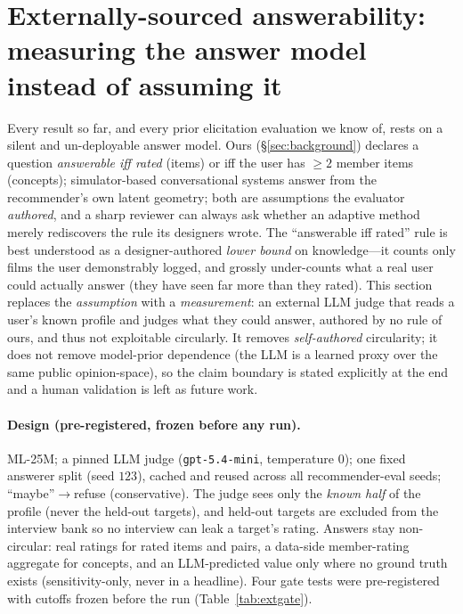 \documentclass[11pt]{article}
\begin{document}
\section{Externally-sourced answerability: measuring the answer model instead of assuming it}\label{sec:external}
Every result so far, and every prior elicitation evaluation we know of, rests on a silent and un-deployable
answer model. Ours (\S\ref{sec:background}) declares a question \emph{answerable iff rated} (items) or iff the
user has $\ge2$ member items (concepts); simulator-based conversational systems answer from the recommender's
own latent geometry; both are assumptions the evaluator \emph{authored}, and a sharp reviewer can always ask
whether an adaptive method merely rediscovers the rule its designers wrote. The ``answerable iff rated'' rule
is best understood as a designer-authored \emph{lower bound} on knowledge---it counts only films the user
demonstrably logged, and grossly under-counts what a real user could actually answer (they have seen far more
than they rated). This section replaces the \emph{assumption} with a \emph{measurement}: an external LLM judge
that reads a user's known profile and judges what they could answer, authored by no rule of ours, and thus not
exploitable circularly. It removes \emph{self-authored} circularity; it does not remove model-prior dependence
(the LLM is a learned proxy over the same public opinion-space), so the claim boundary is stated explicitly at
the end and a human validation is left as future work.

\paragraph{Design (pre-registered, frozen before any run).} ML-25M; a pinned LLM judge (\texttt{gpt-5.4-mini},
temperature $0$); one fixed answerer split (seed $123$), cached and reused across all recommender-eval seeds;
``maybe''$\to$refuse (conservative). The judge sees only the \emph{known half} of the profile (never the
held-out targets), and held-out targets are excluded from the interview bank so no interview can leak a target's
rating. Answers stay non-circular: real ratings for rated items and pairs, a data-side member-rating aggregate
for concepts, and an LLM-predicted value only where no ground truth exists (sensitivity-only, never in a headline).
Four gate tests were pre-registered with cutoffs frozen before the run (Table~\ref{tab:extgate}).
\end{document}
